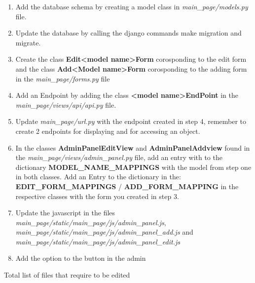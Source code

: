 \documentclass{article}
\begin{document}
\begin{enumerate}
	\item Add the database schema by creating a model class in \textit{main\_page/models.py} file.
	\item Update the database by calling the django commands make migration and migrate.
	\item Create the class \textbf{Edit<model name>Form} corosponding to the edit form and the class \textbf{Add<Model name>Form} corosponding to the adding form in the \textit{main\_page/forms.py} file
	\item Add an Endpoint by adding the class \textbf{<model name>EndPoint} in the \textit{main\_page/views/api/api.py} file.
	\item Update \textit{main\_page/url.py} with the endpoint created in step 4, remember to create 2 endpoints for displaying and for accessing an object. 
	\item In the classes \textbf{AdminPanelEditView} and \textbf{AdminPanelAddview} found in the \textit{main\_page/views/admin\_panel.py} file, add an entry with to the dictionary \textbf{MODEL\_NAME\_MAPPINGS} with the model from step one in both classes. Add an Entry to the dictionary in the:\\ \textbf{EDIT\_FORM\_MAPPINGS} / \textbf{ADD\_FORM\_MAPPING} in the respective classes with the form you created in step 3.
	 \item Update the javascript in the files \textit{main\_page/static/main\_page/js/admin\_panel.js}, \textit{main\_page/static/main\_page/js/admin\_panel\_add.js} and\\ \textit{main\_page/static/main\_page/js/admin\_panel\_edit.js}
	 \item Add the option to the button in the admin
\end{enumerate} 
Total list of files that require to be edited
\end{document}
